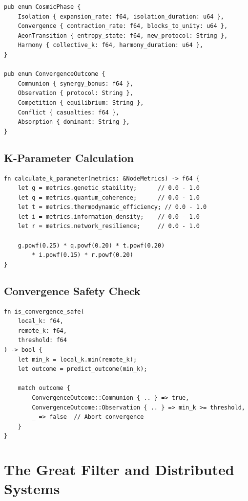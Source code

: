 \documentclass[12pt,a4paper]{article}
\begin{document}
\begin{verbatim}
pub enum CosmicPhase {
    Isolation { expansion_rate: f64, isolation_duration: u64 },
    Convergence { contraction_rate: f64, blocks_to_unity: u64 },
    AeonTransition { entropy_state: f64, new_protocol: String },
    Harmony { collective_k: f64, harmony_duration: u64 },
}

pub enum ConvergenceOutcome {
    Communion { synergy_bonus: f64 },
    Observation { protocol: String },
    Competition { equilibrium: String },
    Conflict { casualties: f64 },
    Absorption { dominant: String },
}
\end{verbatim}

\subsection{K-Parameter Calculation}

\begin{verbatim}
fn calculate_k_parameter(metrics: &NodeMetrics) -> f64 {
    let g = metrics.genetic_stability;      // 0.0 - 1.0
    let q = metrics.quantum_coherence;      // 0.0 - 1.0
    let t = metrics.thermodynamic_efficiency; // 0.0 - 1.0
    let i = metrics.information_density;    // 0.0 - 1.0
    let r = metrics.network_resilience;     // 0.0 - 1.0

    g.powf(0.25) * q.powf(0.20) * t.powf(0.20)
        * i.powf(0.15) * r.powf(0.20)
}
\end{verbatim}

\subsection{Convergence Safety Check}

\begin{verbatim}
fn is_convergence_safe(
    local_k: f64,
    remote_k: f64,
    threshold: f64
) -> bool {
    let min_k = local_k.min(remote_k);
    let outcome = predict_outcome(min_k);

    match outcome {
        ConvergenceOutcome::Communion { .. } => true,
        ConvergenceOutcome::Observation { .. } => min_k >= threshold,
        _ => false  // Abort convergence
    }
}
\end{verbatim}

\section{The Great Filter and Distributed Systems}
\end{document}
